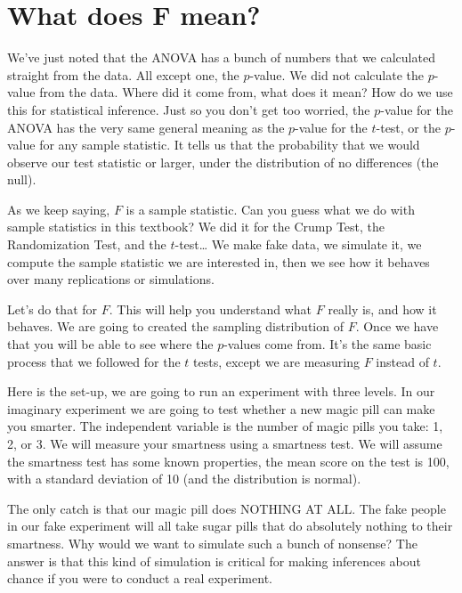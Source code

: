 \documentclass[
]{book}
\begin{document}
\hypertarget{what-does-f-mean}{%
\section{What does F mean?}\label{what-does-f-mean}}

We've just noted that the ANOVA has a bunch of numbers that we calculated straight from the data. All except one, the \(p\)-value. We did not calculate the \(p\)-value from the data. Where did it come from, what does it mean? How do we use this for statistical inference. Just so you don't get too worried, the \(p\)-value for the ANOVA has the very same general meaning as the \(p\)-value for the \(t\)-test, or the \(p\)-value for any sample statistic. It tells us that the probability that we would observe our test statistic or larger, under the distribution of no differences (the null).

As we keep saying, \(F\) is a sample statistic. Can you guess what we do with sample statistics in this textbook? We did it for the Crump Test, the Randomization Test, and the \(t\)-test\ldots{} We make fake data, we simulate it, we compute the sample statistic we are interested in, then we see how it behaves over many replications or simulations.

Let's do that for \(F\). This will help you understand what \(F\) really is, and how it behaves. We are going to created the sampling distribution of \(F\). Once we have that you will be able to see where the \(p\)-values come from. It's the same basic process that we followed for the \(t\) tests, except we are measuring \(F\) instead of \(t\).

Here is the set-up, we are going to run an experiment with three levels. In our imaginary experiment we are going to test whether a new magic pill can make you smarter. The independent variable is the number of magic pills you take: 1, 2, or 3. We will measure your smartness using a smartness test. We will assume the smartness test has some known properties, the mean score on the test is 100, with a standard deviation of 10 (and the distribution is normal).

The only catch is that our magic pill does NOTHING AT ALL. The fake people in our fake experiment will all take sugar pills that do absolutely nothing to their smartness. Why would we want to simulate such a bunch of nonsense? The answer is that this kind of simulation is critical for making inferences about chance if you were to conduct a real experiment.
\end{document}
